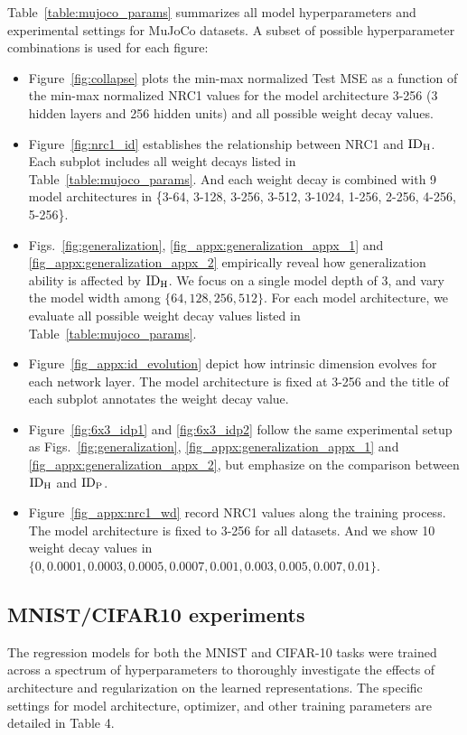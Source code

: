 

Table~\ref{table:mujoco_params} summarizes all model hyperparameters and experimental settings for MuJoCo datasets. A subset of possible hyperparameter combinations is used for each figure:
\begin{itemize}
    \item Figure~\ref{fig:collapse} plots the min-max normalized Test MSE as a function of the min-max normalized NRC1 values for the model architecture 3-256 (3 hidden layers and 256 hidden units) and all possible weight decay values. 
    
      \item Figure~\ref{fig:nrc1_id} establishes the relationship between NRC1 and $\mathrm{ID}_{\mathrm{H}}$. Each subplot includes all weight decays listed in Table~\ref{table:mujoco_params}. And each weight decay is combined with 9 model architectures in \{3-64, 3-128, 3-256, 3-512, 3-1024, 1-256, 2-256, 4-256, 5-256\}.

      \item Figs.~\ref{fig:generalization}, \ref{fig_appx:generalization_appx_1} and \ref{fig_appx:generalization_appx_2} empirically reveal how generalization ability is affected by $\mathrm{ID}_{\mathrm{H}}$. We focus on a single model depth of 3, and vary the model width among $\{64, 128, 256, 512\}$. For each model architecture, we evaluate all possible weight decay values listed in Table~\ref{table:mujoco_params}.


    \item Figure~\ref{fig_appx:id_evolution} depict how intrinsic dimension evolves for each network layer. The model architecture is fixed at 3-256 and the title of each subplot annotates the weight decay value.
    
    \item Figure~\ref{fig:6x3_idp1} and \ref{fig:6x3_idp2} follow the same experimental setup as Figs.~\ref{fig:generalization}, \ref{fig_appx:generalization_appx_1} and \ref{fig_appx:generalization_appx_2}, but emphasize on the comparison between $\mathrm{ID}_{\mathrm{H}}$ and $\mathrm{ID}_{\mathrm{P}}$.

      \item Figure~\ref{fig_appx:nrc1_wd} record NRC1 values along the training process. The model architecture is fixed to 3-256 for all datasets. And we show 10 weight decay values in $\{0, 0.0001, 0.0003, 0.0005, 0.0007, 0.001, 0.003, 0.005, 0.007, 0.01\}$.
\end{itemize}


\subsection{MNIST/CIFAR10 experiments} \label{appx: vision}
The regression models for both the MNIST and CIFAR-10 tasks were trained across a spectrum of hyperparameters to thoroughly investigate the effects of architecture and regularization on the learned representations. The specific settings for model architecture, optimizer, and other training parameters are detailed in Table 4.

